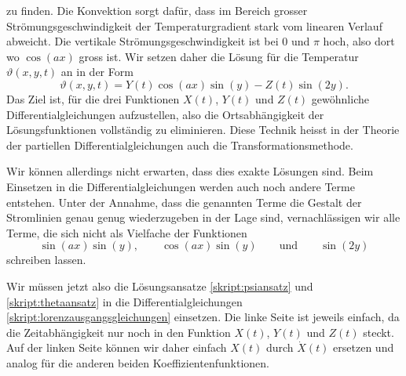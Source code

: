 zu finden.
Die Konvektion sorgt dafür, dass im Bereich grosser
Strömungsgeschwindigkeit der Temperaturgradient stark vom linearen Verlauf
abweicht.
Die vertikale Strömungsgeschwindigkeit ist bei $0$ und $\pi$ hoch, also
dort wo $\cos(ax)$ gross ist.
Wir setzen daher die Lösung für die Temperatur $\vartheta(x,y,t)$ an in der
Form
\begin{equation}
\vartheta(x,y,t)
=
Y(t) \cos(ax) \sin(y) - Z(t) \sin(2y).
\label{skript:thetaansatz}
\end{equation}
Das Ziel ist, für die drei Funktionen $X(t)$, $Y(t)$ und $Z(t)$
gewöhnliche Differentialgleichungen aufzustellen, also die Ortsabhängigkeit
der Lösungsfunktionen vollständig zu eliminieren.
Diese Technik heisst in der Theorie der partiellen Differentialgleichungen
auch die Transformationsmethode.

Wir können allerdings nicht erwarten, dass dies exakte Lösungen sind.
Beim Einsetzen in die Differentialgleichungen werden auch noch
andere Terme entstehen.
Unter der Annahme, dass die genannten Terme die Gestalt der Stromlinien
genau genug wiederzugeben in der Lage sind, vernachlässigen wir alle
Terme, die sich nicht als Vielfache der Funktionen
\begin{equation}
\sin(ax)\sin(y),
\qquad
\cos(ax)\sin(y)
\qquad\text{und}\qquad
\sin(2y)
\label{skript:funktionsauswahl}
\end{equation}
schreiben lassen.

Wir müssen jetzt also die Lösungsansatze
\eqref{skript:psiansatz}
und
\eqref{skript:thetaansatz}
in die Differentialgleichungen
\eqref{skript:lorenzausgangsgleichungen}
einsetzen.
Die linke Seite ist jeweils einfach, da die Zeitabhängigkeit nur noch
in den Funktion $X(t)$, $Y(t)$ und $Z(t)$ steckt.
Auf der linken Seite können wir daher einfach $X(t)$ durch $\dot X(t)$
ersetzen und analog für die anderen beiden Koeffizientenfunktionen.

